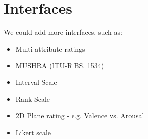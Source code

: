 \documentclass{sig-alternate}
\begin{document}
\section{Interfaces}
	We could add more interfaces, such as: 
	\begin{itemize}
		\item Multi attribute ratings
		\item MUSHRA (ITU-R BS. 1534)~\cite{recommendation20031534}
		\item Interval Scale~\cite{zacharov1999round}
		\item Rank Scale~\cite{pascoe1983evaluation}
		
		\item 2D Plane rating - e.g. Valence vs. Arousal~\cite{carroll1969individual}
		\item Likert scale~\cite{likert1932technique}
		

\end{itemize}
\end{document}
